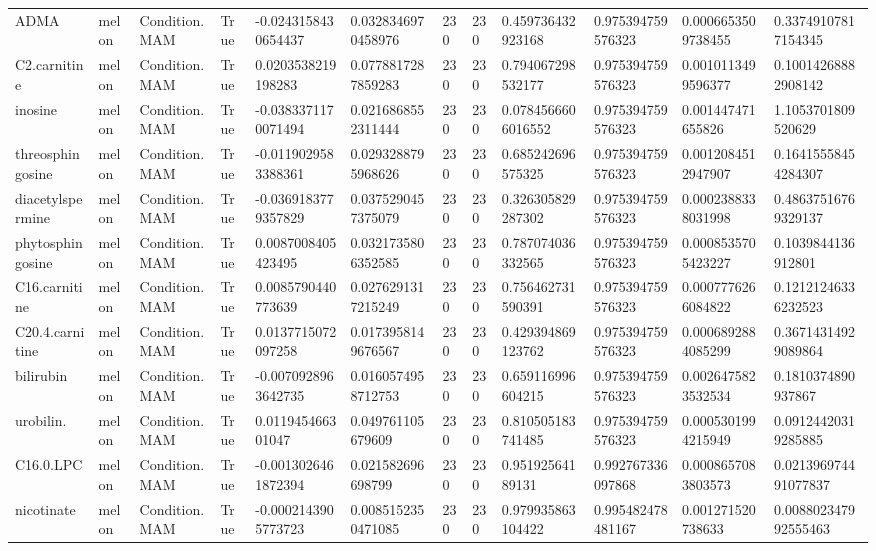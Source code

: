 \begin{longtable}{llllllllllll}
ADMA & melon & Condition.MAM & True & -0.0243158430654437 & 0.0328346970458976 & 230 & 230 & 0.459736432923168 & 0.975394759576323 & 0.0006653509738455 & 0.33749107817154345 \\
C2.carnitine & melon & Condition.MAM & True & 0.0203538219198283 & 0.0778817287859283 & 230 & 230 & 0.794067298532177 & 0.975394759576323 & 0.0010113499596377 & 0.10014268882908142 \\
inosine & melon & Condition.MAM & True & -0.0383371170071494 & 0.0216868552311444 & 230 & 230 & 0.0784566606016552 & 0.975394759576323 & 0.001447471655826 & 1.1053701809520629 \\
threosphingosine & melon & Condition.MAM & True & -0.0119029583388361 & 0.0293288795968626 & 230 & 230 & 0.685242696575325 & 0.975394759576323 & 0.0012084512947907 & 0.16415558454284307 \\
diacetylspermine & melon & Condition.MAM & True & -0.0369183779357829 & 0.0375290457375079 & 230 & 230 & 0.326305829287302 & 0.975394759576323 & 0.0002388338031998 & 0.48637516769329137 \\
phytosphingosine & melon & Condition.MAM & True & 0.0087008405423495 & 0.0321735806352585 & 230 & 230 & 0.787074036332565 & 0.975394759576323 & 0.0008535705423227 & 0.1039844136912801 \\
C16.carnitine & melon & Condition.MAM & True & 0.0085790440773639 & 0.0276291317215249 & 230 & 230 & 0.756462731590391 & 0.975394759576323 & 0.0007776266084822 & 0.12121246336232523 \\
C20.4.carnitine & melon & Condition.MAM & True & 0.0137715072097258 & 0.0173958149676567 & 230 & 230 & 0.429394869123762 & 0.975394759576323 & 0.0006892884085299 & 0.36714314929089864 \\
bilirubin & melon & Condition.MAM & True & -0.0070928963642735 & 0.0160574958712753 & 230 & 230 & 0.659116996604215 & 0.975394759576323 & 0.0026475823532534 & 0.1810374890937867 \\
urobilin. & melon & Condition.MAM & True & 0.011945466301047 & 0.049761105679609 & 230 & 230 & 0.810505183741485 & 0.975394759576323 & 0.0005301994215949 & 0.09124420319285885 \\
C16.0.LPC & melon & Condition.MAM & True & -0.0013026461872394 & 0.021582696698799 & 230 & 230 & 0.95192564189131 & 0.992767336097868 & 0.0008657083803573 & 0.021396974491077837 \\
nicotinate & melon & Condition.MAM & True & -0.0002143905773723 & 0.0085152350471085 & 230 & 230 & 0.979935863104422 & 0.995482478481167 & 0.001271520738633 & 0.008802347992555463 \\

\end{longtable}

